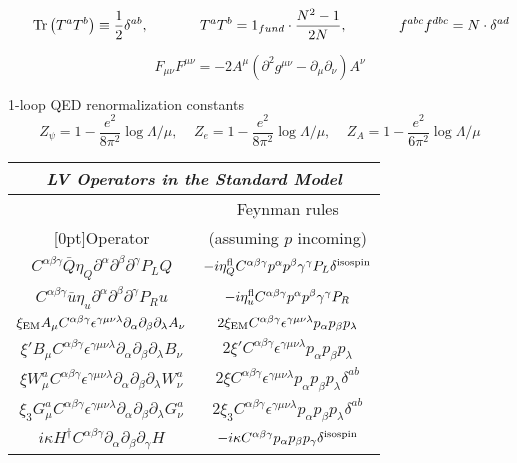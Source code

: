 \documentclass[14pt]{article}
\begin{document}
\[
~~~~~{\rm Tr} \left( T^a T^b \right) \equiv \frac{1}{2}\delta^{ab},~~~~~~~~~~~
T^a T^b = 1_{fund} \cdot \frac{ N^2 - 1} {2 N},~~~~~~~~~~~
f^{abc}f^{dbc} = N\cdot \delta^{ad}
\]

\[
F_{\mu\nu}F^{\mu\nu} = - 2 A^\mu\left ( \partial^2 g^{\mu\nu} -
					\partial_\mu\partial_\nu \right) A^\nu
\]


1-loop QED renormalization constants
\[
   Z_\psi = 1 - \frac{e^2}{8\pi^2}\log\Lambda/\mu,~~~~~
   Z_e = 1 - \frac{e^2}{8\pi^2}\log\Lambda/\mu,~~~~~
   Z_A = 1 - \frac{e^2}{6\pi^2}\log\Lambda/\mu
\]

\renewcommand{\arraystretch}{1.5}
\begin{tabular}{|c|c|}
\hline
\multicolumn{2}{|c|}{\it LV Operators in the Standard Model} \\
\hline
\hline
 & Feynman rules  \\
\raisebox{2.2ex}[0pt]{Operator} & (assuming $p$ incoming) \\
\hline
\hline
$
C^{\alpha\beta\gamma}\bar{Q}\eta_Q
\partial^\alpha\partial^\beta\partial^\gamma P_L Q 
$ &
$
- i \eta_Q^{\rm fl} C^{\alpha\beta\gamma} p^\alpha p^\beta \gamma^\gamma
			P_L \delta^{\rm isospin}
$  \\

$ C^{\alpha\beta\gamma}\bar{u}\eta_u
\partial^\alpha\partial^\beta\partial^\gamma P_R u
$ &
$
- i \eta_u^{\rm fl} C^{\alpha\beta\gamma} p^\alpha p^\beta \gamma^\gamma
			P_R 
$  \\

$ \xi_{\rm EM} A_\mu C^{\alpha\beta\gamma} 
  \epsilon^{\gamma\mu\nu\lambda} 
\partial_\alpha \partial_\beta \partial_\lambda A_\nu $ & 

$ 2 \xi_{\rm EM} C^{\alpha\beta\gamma}   \epsilon^{\gamma\mu\nu\lambda} 
	p_\alpha p_\beta p_\lambda $ \\

$ \xi' B_\mu C^{\alpha\beta\gamma} 
  \epsilon^{\gamma\mu\nu\lambda} 
\partial_\alpha \partial_\beta \partial_\lambda B_\nu $ & 

$ 2 \xi' C^{\alpha\beta\gamma}   \epsilon^{\gamma\mu\nu\lambda} 
	p_\alpha p_\beta p_\lambda $ \\

$ \xi W_\mu^a C^{\alpha\beta\gamma} 
  \epsilon^{\gamma\mu\nu\lambda} 
\partial_\alpha \partial_\beta \partial_\lambda W_\nu^a $ & 

$ 2 \xi C^{\alpha\beta\gamma}   \epsilon^{\gamma\mu\nu\lambda} 
	p_\alpha p_\beta p_\lambda \delta^{ab}$ \\

$ \xi_3 G_\mu^a C^{\alpha\beta\gamma} 
  \epsilon^{\gamma\mu\nu\lambda} 
\partial_\alpha \partial_\beta \partial_\lambda G_\nu^a $ & 

$ 2 \xi_3 C^{\alpha\beta\gamma}   \epsilon^{\gamma\mu\nu\lambda} 
	p_\alpha p_\beta p_\lambda \delta^{ab}$ \\

$ i \kappa H^\dag C^{\alpha\beta\gamma} 
\partial_\alpha \partial_\beta \partial_\gamma H $ &
$ -i \kappa C^{\alpha\beta\gamma} p_\alpha p_\beta p_\gamma 
	\delta^{\rm isospin} $ \\
\hline
\end{tabular}
\end{document}
